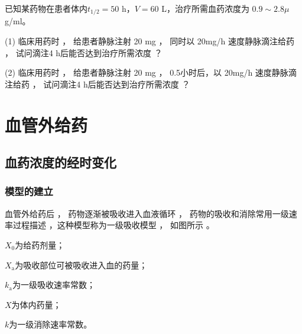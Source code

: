\documentclass[dvipsnames, svgnames, x11names]{beamer}
\begin{document}
\begin{frame}[t]
    \frametitle{}
    \begin{question}
        已知某药物在患者体内$t_{1/2}= 50$ h，$V=60$ L，治疗所需血药浓度为 $0.9\sim 2.8 \mu$g/ml。 
        
        (1) 临床用药时 ， 给患者静脉注射 20 mg ， 同时以 20mg/h 速度静脉滴注给药 ， 试问滴注4 h后能否达到治疗所需浓度 ？

        (2) 临床用药时 ， 给患者静脉注射 20 mg ， 0.5小时后，以 20mg/h 速度静脉滴注给药 ， 试问滴注4 h后能否达到治疗所需浓度 ？
    \end{question}
\end{frame}


\section{血管外给药}


\subsection{血药浓度的经时变化}


\begin{frame}
    \frametitle{模型的建立}
    血管外给药后 ， 药物逐渐被吸收进入血液循环 ， 药物的吸收和消除常用一级速率过程描述 ，这种模型称为一级吸收模型 ， 如图所示 。
    \begin{center}
    \end{center}
    $X_0$为给药剂量；

    $X_\mathrm{a}$为吸收部位可被吸收进入血的药量；

    $k_\mathrm{a}$为一级吸收速率常数；
    
    $X$为体内药量；
    
    $k$为一级消除速率常数。
\end{frame}
\end{document}
